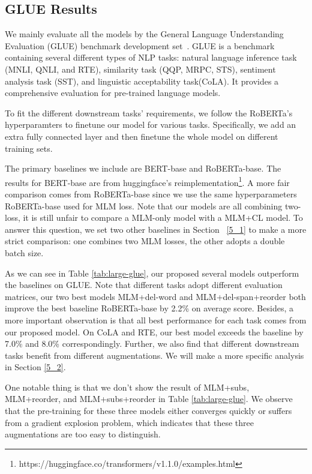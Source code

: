 \documentclass[11pt,a4paper]{article}
\begin{document}
 \subsection{GLUE Results} \label{exp-glue-wiki103}
We mainly evaluate all the models by the General Language Understanding Evaluation (GLUE) benchmark development set~\cite{wang2018glue}. GLUE is a benchmark containing several different types of NLP tasks: natural language inference task (MNLI, QNLI, and RTE), similarity task (QQP, MRPC, STS), sentiment analysis task (SST), and linguistic acceptability task(CoLA). It provides a comprehensive evaluation for pre-trained language models.

To fit the different downstream tasks' requirements, we follow the RoBERTa's hyperparamters to finetune our model for various tasks. Specifically, we add an extra fully connected layer and then finetune the whole model on different training sets. 

The primary baselines we include are BERT-base and RoBERTa-base.  The results for BERT-base are from huggingface's reimplementation\footnote{https://huggingface.co/transformers/v1.1.0/examples.html}. A more fair comparison comes from RoBERTa-base since we use the same hyperparameters RoBERTa-base used for MLM loss. Note that our models are all combining two-loss, it is still unfair to compare a MLM-only model with a MLM+CL model. To answer this question, we set two other baselines in Section ~\ref{5_1} to make a more strict comparison: one combines two MLM losses, the other adopts a double batch size. 

As we can see in Table \ref{tab:large-glue}, our proposed several models outperform the baselines on GLUE. Note that different tasks adopt different evaluation matrices, our two best models MLM+del-word and MLM+del-span+reorder both improve the best baseline RoBERTa-base by 2.2\% on average score. Besides, a more important observation is that all best performance for each task comes from our proposed model. On CoLA and RTE, our best model exceeds the baseline by 7.0\% and 8.0\% correspondingly. Further, we also find that different downstream tasks benefit from different augmentations. We will make a more specific analysis in Section \ref{5_2}.

One notable thing is that we don't show the result of MLM+subs, MLM+reorder, and MLM+subs+reorder in Table \ref{tab:large-glue}. We observe that the pre-training for these three models either converges quickly or suffers from a gradient explosion problem, which indicates that these three augmentations are too easy to distinguish. 
\end{document}
